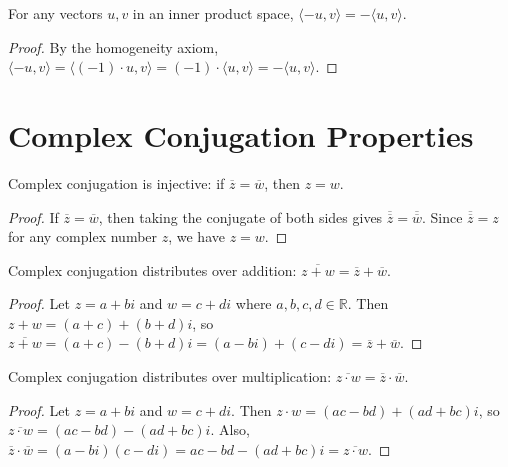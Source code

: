\begin{lemma}
  \label{lemma : inner_minus_left}
  \leanok
  For any vectors $u, v$ in an inner product space, $\langle -u, v \rangle = -\langle u, v \rangle$.
\end{lemma}
\begin{proof}
  By the homogeneity axiom, $\langle -u, v \rangle = \langle (-1) \cdot u, v \rangle = (-1) \cdot \langle u, v \rangle = -\langle u, v \rangle$.
\end{proof}

\section{Complex Conjugation Properties}

\begin{lemma}
  \label{lemma : conj_inj}
  \leanok
  Complex conjugation is injective: if $\overline{z} = \overline{w}$, then $z = w$.
\end{lemma}
\begin{proof}
  If $\overline{z} = \overline{w}$, then taking the conjugate of both sides gives $\overline{\overline{z}} = \overline{\overline{w}}$. Since $\overline{\overline{z}} = z$ for any complex number $z$, we have $z = w$.
\end{proof}

\begin{lemma}
  \label{lemma : conj_add}
  \leanok
  Complex conjugation distributes over addition: $\overline{z + w} = \overline{z} + \overline{w}$.
\end{lemma}
\begin{proof}
  Let $z = a + bi$ and $w = c + di$ where $a, b, c, d \in \mathbb{R}$. Then $z + w = (a + c) + (b + d)i$, so $\overline{z + w} = (a + c) - (b + d)i = (a - bi) + (c - di) = \overline{z} + \overline{w}$.
\end{proof}

\begin{lemma}
  \label{lemma : conj_mull}
  \leanok
  Complex conjugation distributes over multiplication: $\overline{z \cdot w} = \overline{z} \cdot \overline{w}$.
\end{lemma}
\begin{proof}
  Let $z = a + bi$ and $w = c + di$. Then $z \cdot w = (ac - bd) + (ad + bc)i$, so $\overline{z \cdot w} = (ac - bd) - (ad + bc)i$. Also, $\overline{z} \cdot \overline{w} = (a - bi)(c - di) = ac - bd - (ad + bc)i = \overline{z \cdot w}$.
\end{proof}

